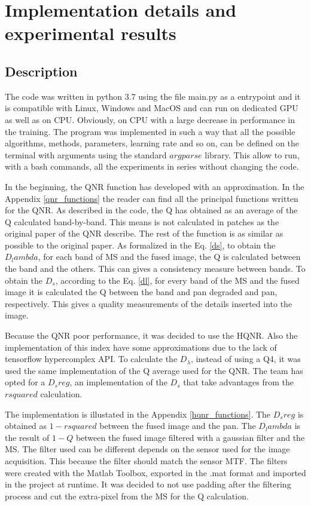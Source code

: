 \documentclass[12pt]{report}
\begin{document}
\chapter{Implementation details and experimental results}\label{chap4}
\section{Description}
The code was written in python 3.7 using the file main.py as a entrypoint and it is compatible with Linux, Windows and MacOS and can run on dedicated GPU as well as on CPU.
Obviously, on CPU with a large decrease in performance in the training.
The program was implemented in such a way that all the possible algorithms, methods, parameters, learning rate and so on,
can be defined on the terminal with arguments using the standard $argparse$ library.
This allow to run, with a bash commands, all the experiments in series without changing the code.

In the beginning, the QNR function has developed with an approximation. In the Appendix \ref{qnr_functions} the reader can 
find all the principal functions written for the QNR. 
As described in the code, the Q has obtained as an average of the Q calculated band-by-band.
This means is not calculated in patches as the original paper of the QNR describe.
The rest of the function is as similar as possible to the original paper.
As formalized in the Eq. \ref{ds}, to obtain the $D_lambda$, for each band of MS and the fused image, the Q is calculated between
the band and the others. This can gives a consistency measure between bands. 
To obtain the $D_s$, according to the Eq. \ref{dl}, for every band of the MS and the fused image it is calculated the Q between the band and
pan degraded and pan, respectively. This gives a quality measurements of the details inserted into the image. 

Because the QNR poor performance, it was decided to use the HQNR. Also the implementation of this index have some approximations due to the lack of tensorflow hypercomplex API.
To calculate the $D_\lambda$, instead of using a Q4, it was used the same implementation of the Q average used for the QNR.
The team has opted for a $D_sreg$, an implementation of the $D_s$ that take advantages from the $r squared$ calculation.  

The implementation is illustated in the Appendix \ref{hqnr_functions}.
The $D_sreg$ is obtained as $1 - rsquared$ between the fused image and the pan. 
The $D_lambda$ is the result of $1 - Q$ between the fused image filtered with a gaussian filter and the MS.
The filter used can be different depends on the sensor used for the image acquisition.
This because the filter should match the sensor MTF.   
The filters were created with the Matlab Toolbox, exported in the .mat format and imported in the project at runtime.
It was decided to not use padding after the filtering process and cut the extra-pixel from the MS for the Q calculation.  
\end{document}
